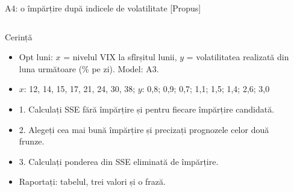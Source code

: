 \begin{frame}{A4: o împărțire după indicele de volatilitate [Propus]}
\propsub
\itemsize{\scriptsize}
\begin{columns}[T]
\begin{column}{\taskw}
\begin{block}{Cerință}
\begin{itemize}
    \item Opt luni: $x$ = nivelul VIX la sfîrșitul lunii, $y$ = volatilitatea realizată din luna următoare (\% pe zi). Model: A3.
    \item $x$: 12, 14, 15, 17, 21, 24, 30, 38; $y$: 0,8; 0,9; 0,7; 1,1; 1,5; 1,4; 2,6; 3,0
    \item 1. Calculați SSE fără împărțire și pentru fiecare împărțire candidată.
    \item 2. Alegeți cea mai bună împărțire și precizați prognozele celor două frunze.
    \item 3. Calculați ponderea din SSE eliminată de împărțire.
    \item Raportați: tabelul, trei valori și o frază.
\end{itemize}
\end{block}
\end{column}
\begin{column}{\solw}
\end{column}
\end{columns}
\end{frame}

